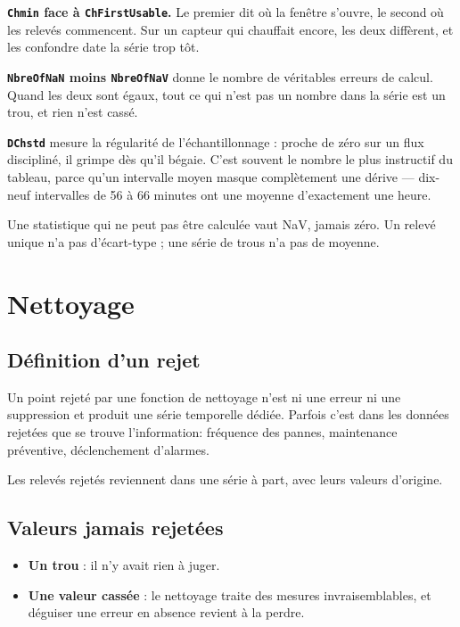 \documentclass[11pt,a4paper]{report}
\providecommand{\tightlist}{\setlength{\itemsep}{0pt}\setlength{\parskip}{0pt}}
\begin{document}
\textbf{\texttt{Chmin} face à \texttt{ChFirstUsable}.} Le premier dit où
la fenêtre s'ouvre, le second où les relevés commencent. Sur un capteur
qui chauffait encore, les deux diffèrent, et les confondre date la série
trop tôt.

\textbf{\texttt{NbreOfNaN} moins \texttt{NbreOfNaV}} donne le nombre de
véritables erreurs de calcul. Quand les deux sont égaux, tout ce qui
n'est pas un nombre dans la série est un trou, et rien n'est cassé.

\textbf{\texttt{DChstd}} mesure la régularité de l'échantillonnage :
proche de zéro sur un flux discipliné, il grimpe dès qu'il bégaie. C'est
souvent le nombre le plus instructif du tableau, parce qu'un intervalle
moyen masque complètement une dérive --- dix-neuf intervalles de 56 à 66
minutes ont une moyenne d'exactement une heure.

Une statistique qui ne peut pas être calculée vaut NaV, jamais zéro. Un
relevé unique n'a pas d'écart-type ; une série de trous n'a pas de
moyenne.

\chapter{Nettoyage}\label{chap:nettoyage}

\section{Définition d'un rejet}

Un point rejeté par une fonction de nettoyage n'est ni une erreur ni une suppression et produit une série temporelle dédiée.
Parfois c'est dans les données rejetées que se trouve l'information: fréquence des pannes, maintenance préventive, déclenchement d'alarmes.


Les relevés rejetés reviennent dans une série à part, avec leurs valeurs
d'origine.

\section{Valeurs jamais rejetées}

\begin{itemize}
\tightlist
\item
  \textbf{Un trou} : il n'y avait rien à juger.
\item
  \textbf{Une valeur cassée} : le nettoyage traite des mesures
  invraisemblables, et déguiser une erreur en absence revient à la
  perdre.
\end{itemize}
\end{document}
